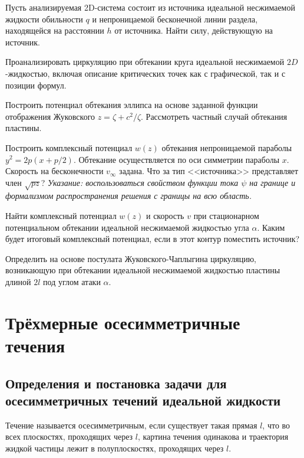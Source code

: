 \documentclass[a4paper, 14pt]{extarticle}
\begin{document}
\begin{problems}
	\item
	Пусть анализируемая 2D-система состоит из источника идеальной несжимаемой жидкости обильности $q$  и непроницаемой бесконечной линии раздела, находящейся на расстоянии $h$ от источника. Найти силу, действующую на источник.
	
	\item 
	Проанализировать циркуляцию при обтекании круга идеальной несжимаемой $2D$-жидкостью, включая описание критических точек как с графической, так и с позиции формул.
	
	\item 
	Построить потенциал обтекания эллипса на основе заданной функции отображения Жуковского $z = \zeta + c^2/\zeta$. Рассмотреть частный случай обтекания пластины.
	
	\item 
	Построить комплексный потенциал $w(z)$ обтекания непроницаемой параболы $y^2 = 2 p (x+p/2)$. Обтекание осуществляется по оси симметрии параболы $x$. Скорость на бесконечности $v_\infty$  задана.  Что за тип <<источника>> представляет член $\sqrt{pz}$? \textit{Указание: воспользоваться свойством функции тока $\psi$  на границе и формализмом распространения решения с границы на всю область.}
	
	\item
	Найти комплексный потенциал $w(z)$ и скорость $v$ при стационарном потенциальном обтекании идеальной несжимаемой жидкостью угла $\alpha$. Каким будет итоговый комплексный потенциал, если в этот контур поместить источник?
	
	\item
	Определить на основе постулата Жуковского-Чаплыгина циркуляцию, возникающую при обтекании идеальной несжимаемой жидкостью пластины длиной $2l$ под углом атаки $\alpha$.
	
\end{problems}

\section{Трёхмерные осесимметричные течения}


\subsection{Определения и постановка задачи для осесимметричных течений идеальной жидкости}



\begin{dfn}
Течение называется \alert{осесимметричным}, если существует такая прямая $l$, что во всех плоскостях, проходящих через $l$, картина течения одинакова и траектория жидкой частицы лежит в полуплоскостях, проходящих через $l$.
\end{dfn}
\end{document}

